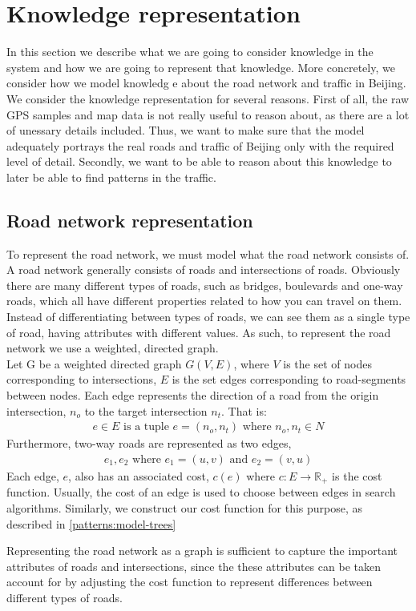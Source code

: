 \section{Knowledge representation}
In this section we describe what we are going to consider knowledge in the system and how we are going to represent that knowledge. More concretely, we consider how we model knowledg
e about the road network and traffic in Beijing. We consider the knowledge representation for several reasons. First of all, the raw GPS samples and map data is not really useful to reason about, as there are a lot of unessary details included. Thus, we want to make sure that the model adequately portrays the real roads and traffic of Beijing only with the required level of detail. Secondly, we want to be able to reason about this knowledge to later be able to find patterns in the traffic.

\subsection{Road network representation}
To represent the road network, we must model what the road network consists of. A road network generally consists of roads and intersections of roads. Obviously there are many different types of roads, such as bridges, boulevards and one-way roads, which all have different properties related to how you can travel on them. Instead of differentiating between types of roads, we can see them as a single type of road, having attributes with different values. As such, to represent the road network we use a weighted, directed graph.\\
Let G be a weighted directed graph $G(V,E)$, where $V$ is the set of nodes corresponding to intersections, $E$ is the set edges corresponding to road-segments between nodes. Each edge represents the direction of a road from the origin intersection, $n_o$ to the target intersection $n_t$. That is:
\begin{align*}
  e \in E \text{ is a tuple } e=(n_o, n_t) \text{ where } n_o, n_t \in N
\end{align*}
Furthermore, two-way roads are represented as two edges,
\begin{align*}
  e_1, e_2 \text{ where } e_1 = (u, v) \text{ and } e_2=(v, u)
\end{align*}
Each edge, $e$, also has an associated cost, $c(e)$ where  $c: E \rightarrow \mathbb R_+$ is the cost function. Usually, the cost of an edge is used to choose between edges in search algorithms. Similarly, we construct our cost function for this purpose, as described in \ref{patterns:model-trees} \par
Representing the road network as a graph is sufficient to capture the important attributes of roads and intersections, since the these attributes can be taken account for by adjusting the cost function to represent differences between different types of roads.

